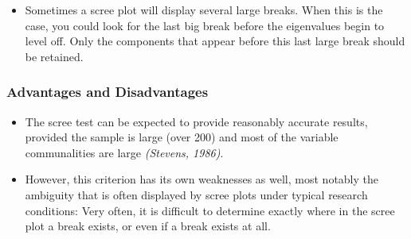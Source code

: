 \documentclass[a4paper,12pt]{article}
\begin{document}
\begin{itemize}
	\item Sometimes a scree plot will display several large breaks.  When this is the case, you could look
	for the last big break before the eigenvalues begin to level off. Only the components that appear
	before this last large break should be retained.
\end{itemize}


\subsubsection*{Advantages and Disadvantages}
\begin{itemize}
	\item The scree test can be expected to provide reasonably accurate results, provided the sample is
	large (over 200) and most of the variable communalities are large \textit{(Stevens, 1986)}. 
	\item However,
	this criterion has its own weaknesses as well, most notably the ambiguity that is often displayed
	by scree plots under typical research conditions:  Very often, it is difficult to determine exactly
	where in the scree plot a break exists, or even if a break exists at all.
\end{itemize}
\end{document}
